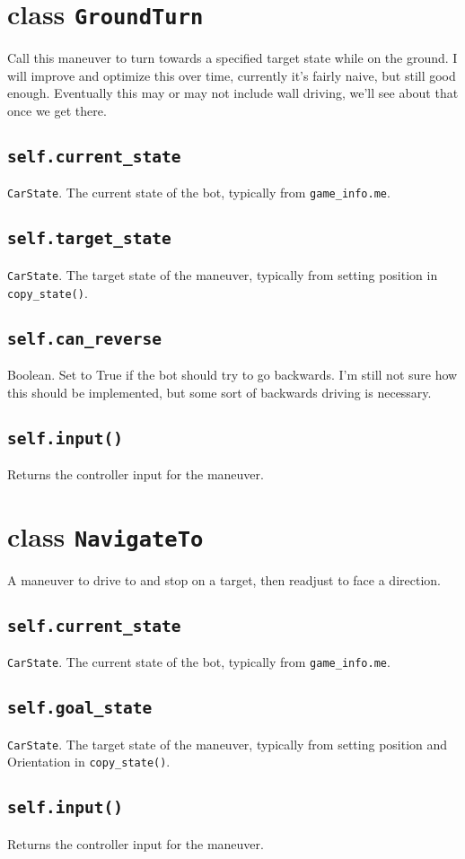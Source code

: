 \documentclass{article}
\newcommand{\class}[1]{\section{class \texttt{#1}}}
\newcommand{\attribute}[1]{\subsection{\texttt{self.#1}}}
\newcommand{\method}[1]{\subsection{\texttt{self.#1}}}
\begin{document}
\begin{flushleft}
\class{GroundTurn}
      {

        Call this maneuver to turn towards a specified target state while on the ground.  I will improve and optimize this over time, currently it's fairly naive, but still good enough.  Eventually this may or may not include wall driving, we'll see about that once we get there.

        
        \attribute{current\_state}
                  {
                    \texttt{CarState}.  The current state of the bot, typically from \texttt{game\_info.me}.
                  }
        \attribute{target\_state}
                  {
                    \texttt{CarState}.  The target state of the maneuver, typically from setting position in \texttt{copy\_state()}.
                  }

        \attribute{can\_reverse}
                  {
                    Boolean.  Set to True if the bot should try to go backwards.  I'm still not sure how this should be implemented, but some sort of backwards driving is necessary.
                  }
        \method{input()}
               {
                 Returns the controller input for the maneuver.
               }

      }
      

\class{NavigateTo}
      {

        A maneuver to drive to and stop on a target, then readjust to face a direction.
        
        \attribute{current\_state}
                  {
                    \texttt{CarState}.  The current state of the bot, typically from \texttt{game\_info.me}.
                  }

        \attribute{goal\_state}
                  {
                    \texttt{CarState}.  The target state of the maneuver, typically from setting position and Orientation in \texttt{copy\_state()}.
                  }
        \method{input()}
               {
                 Returns the controller input for the maneuver.                 
               }

      }
      





































  
  





\end{flushleft}
\end{document}
